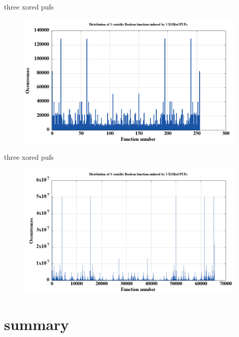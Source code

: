 \documentclass[10pt, compress]{beamer}
\begin{document}
\begin{frame}{three xored pufs}
    \begin{figure}
        \centering
        \includegraphics[width=\textwidth]{figures/dist/distribution_of_3-variable_boolean_functions_induced_by_3_xored_pufs.png}
    \end{figure}
\end{frame}

\begin{frame}{three xored pufs}
    \begin{figure}
        \centering
        \includegraphics[width=\textwidth]{figures/dist/distribution_of_4-variable_boolean_functions_induced_by_3_xored_pufs.png}
    \end{figure}
\end{frame}

\section{summary}
\end{document}
